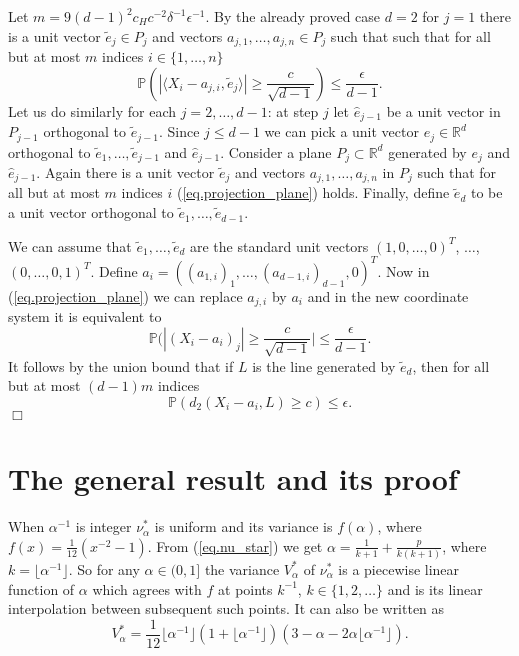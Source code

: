 \documentclass{article}
\newenvironment{proofof}[1]{\noindent {\bf Proof of #1}}{\hspace*{\fill}$\Box$}
\newcommand{\pr}{\mathbb P}
\begin{document}
\begin{proofof}{Lemma~\ref{lem.halasz_corollary2}}
    Let $m=9 (d-1)^2 c_H c^{-2}  \delta^{-1}  \epsilon^{-1}$.
    By the already proved case $d=2$ for $j=1$ there is a unit vector $\tilde{e}_j \in P_j$ and vectors $a_{j,1}, \dots, a_{j,n} \in P_j$ such that
    such that for all but at most $m$
indices $i \in \{1, \dots, n\}$
    \begin{equation}\label{eq.projection_plane}
        \pr(|\langle X_i - a_{j,i}, \tilde{e}_j \rangle| \ge \frac c {\sqrt{d-1}}) \le \frac {\epsilon} {d-1}.
    \end{equation}
    Let us do similarly for each $j=2, \dots, d-1$: at step $j$ let 
    $\hat{e}_{j-1}$ be a unit vector in $P_{j-1}$ orthogonal to $\tilde{e}_{j-1}$. Since $j \le d-1$
    we can pick a unit vector $e_j \in \mathbb{R}^d$ orthogonal to $\tilde{e}_1, \dots, \tilde{e}_{j-1}$ and $\hat{e}_{j-1}$.
    Consider a plane $P_j \subset \mathbb{R}^d$ generated 
    by $e_j$ and $\hat{e}_{j-1}$. Again there is a unit vector $\tilde{e}_j$ and vectors $a_{j,1}, \dots, a_{j,n}$ in $P_j$ such that for all but
    at most $m$ indices $i$ (\ref{eq.projection_plane}) holds.
    Finally, define $\tilde{e}_d$ to be a unit vector orthogonal to $\tilde{e}_1, \dots, \tilde{e}_{d-1}$.

    We can assume that $\tilde{e}_1, \dots, \tilde{e}_d$ are the standard unit vectors $(1, 0,\dots, 0)^T$, $\dots$, $(0, \dots, 0, 1)^T$. Define $a_i = ((a_{1,i})_1, \dots, (a_{d-1, i})_{d-1}, 0)^T$. Now in (\ref{eq.projection_plane}) we can replace $a_{j,i}$ by $a_i$ and in the new coordinate  system it is equivalent to
\[
        \pr(|(X_i - a_i)_j| \ge \frac {c} {\sqrt{d-1}}| \le \frac {\epsilon}{d-1}.
    \]
It follows by the union bound that if $L$ is the line generated by $\tilde{e}_d$, then for all but at most $(d-1) m$ indices
    \[
        \pr(d_2(X_i - a_i, L) \ge c) \le \epsilon.
    \]
\end{proofof}




\section{The general result and its proof}
\label{sec.general}


When $\alpha^{-1}$ is integer $\nu^*_\alpha$ is uniform and its variance is $f(\alpha)$, where $f(x)=\frac 1 {12} (x^{-2} - 1)$. From (\ref{eq.nu_star}) we get $\alpha = \frac 1 {k+1} + \frac p {k(k+1)}$, where $k=\lfloor \alpha^{-1} \rfloor$. So for any $\alpha \in (0, 1]$ the variance $V_\alpha^*$ of $\nu^*_{\alpha}$ is a piecewise linear function of $\alpha$ which agrees with $f$ at points $k^{-1}$, $k\in\{1,2,\dots\}$
and is its linear interpolation between subsequent such points. It can also be written as
\begin{equation}\label{eq.V_alpha}
    V_\alpha^*  =  \frac 1 {12} \lfloor \alpha^{-1} \rfloor  (1 + \lfloor \alpha^{-1} \rfloor) (3 - \alpha - 2 \alpha \lfloor \alpha^{-1} \rfloor).
\end{equation}
\end{document}
